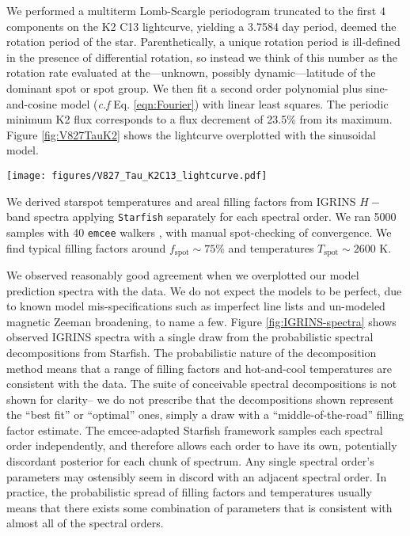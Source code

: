 \documentclass[twocolumn]{emulateapj}%
\begin{document}
We performed a multiterm Lomb-Scargle periodogram \citep{ivezic14} truncated to the first $4$ components \citep{vanderplas15a} on the K2 C13 lightcurve, yielding a 3.7584 day period, deemed the rotation period of the star.  Parenthetically, a unique rotation period is ill-defined in the presence of differential rotation, so instead we think of this number as the rotation rate evaluated at the---unknown, possibly dynamic---latitude of the dominant spot or spot group.  We then fit a second order polynomial plus sine-and-cosine model (\emph{c.f} Eq. \ref{eqn:Fourier}) with linear least squares.  The periodic minimum K2 flux corresponds to a flux decrement of 23.5\% from its maximum.  Figure \ref{fig:V827TauK2} shows the lightcurve overplotted with the sinusoidal model.

\begin{figure*}
 \centering
 \texttt{[image: figures/V827\_Tau\_K2C13\_lightcurve.pdf]}
 \caption{K2 C13 lightcurve of V827 Tau with a polynomial and sinusoidal model overplotted.  A few flares are perceptible.}
 \label{fig:V827TauK2}
\end{figure*}

We derived starspot temperatures and areal filling factors from IGRINS $H-$band spectra applying \texttt{Starfish} separately for each spectral order.  We ran 5000 samples with 40 \texttt{emcee} walkers \citep{foreman13}, with manual spot-checking of convergence.  We find typical filling factors around $f_\mathrm{spot} \sim 75\%$ and temperatures $T_\mathrm{spot} \sim 2600$ K.

We observed reasonably good agreement when we overplotted our model prediction spectra with the data.  We do not expect the models to be perfect, due to known model mis-specifications such as imperfect line lists and un-modeled magnetic Zeeman broadening, to name a few.  Figure \ref{fig:IGRINS-spectra} shows observed IGRINS spectra with a single draw from the probabilistic spectral decompositions from Starfish.  The probabilistic nature of the decomposition method means that a range of filling factors and hot-and-cool temperatures are consistent with the data.  The suite of conceivable spectral decompositions is not shown for clarity-- we do not prescribe that the decompositions shown represent the ``best fit'' or ``optimal'' ones, simply a draw with a ``middle-of-the-road'' filling factor estimate.  The emcee-adapted Starfish framework samples each spectral order independently, and therefore allows each order to have its own, potentially discordant posterior for each chunk of spectrum.  Any single spectral order's parameters may ostensibly seem in discord with an adjacent spectral order.  In practice, the probabilistic spread of filling factors and temperatures usually means that there exists some combination of parameters that is consistent with almost all of the spectral orders.
\end{document}
